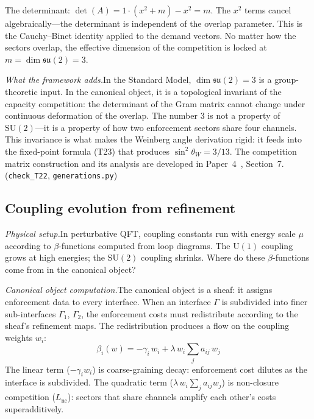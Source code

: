 \documentclass[11pt]{article}
\newcommand{\SU}{\mathrm{SU}}
\newcommand{\U}{\mathrm{U}}
\begin{document}
The determinant: $\det(A) = 1\cdot(x^2 + m) - x^2 = m$.  The $x^2$ terms cancel algebraically---the determinant is independent of the overlap parameter.  This is the Cauchy--Binet identity applied to the demand vectors.  No matter how the sectors overlap, the effective dimension of the competition is locked at $m = \dim\mathfrak{su}(2) = 3$.

\textit{What the framework adds.}\quad In the Standard Model, $\dim\mathfrak{su}(2) = 3$ is a group-theoretic input.  In the canonical object, it is a topological invariant of the capacity competition: the determinant of the Gram matrix cannot change under continuous deformation of the overlap.  The number 3 is not a property of $\SU(2)$---it is a property of how two enforcement sectors share four channels.  This invariance is what makes the Weinberg angle derivation rigid: it feeds into the fixed-point formula (T23) that produces $\sin^2\!\theta_W = 3/13$.  The competition matrix construction and its analysis are developed in Paper~4~\cite{P4}, Section~7.  (\texttt{check\_T22}, \texttt{generations.py})


\subsection{Coupling evolution from refinement}

\textit{Physical setup.}\quad In perturbative QFT, coupling constants run with energy scale $\mu$ according to $\beta$-functions computed from loop diagrams.  The $\U(1)$ coupling grows at high energies; the $\SU(2)$ coupling shrinks.  Where do these $\beta$-functions come from in the canonical object?

\textit{Canonical object computation.}\quad The canonical object is a sheaf: it assigns enforcement data to every interface.  When an interface $\Gamma$ is subdivided into finer sub-interfaces $\Gamma_1$, $\Gamma_2$, the enforcement costs must redistribute according to the sheaf's refinement maps.  The redistribution produces a flow on the coupling weights $w_i$:
\begin{equation}
\beta_i(w) = -\gamma_i\, w_i + \lambda\, w_i \sum_j a_{ij}\, w_j
\end{equation}
The linear term ($-\gamma_i w_i$) is coarse-graining decay: enforcement cost dilutes as the interface is subdivided.  The quadratic term ($\lambda\, w_i \sum_j a_{ij} w_j$) is non-closure competition ($L_{\mathrm{nc}}$): sectors that share channels amplify each other's costs superadditively.
\end{document}
